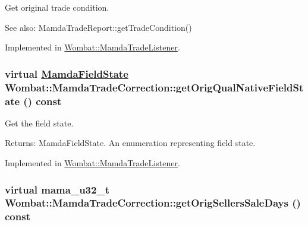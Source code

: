 Get original trade condition. 

\begin{Desc}
\item[See also:]Mamda\-Trade\-Report::get\-Trade\-Condition() \end{Desc}


Implemented in \hyperlink{classWombat_1_1MamdaTradeListener_3d7a8290418015b6f8e1bc2e412225b1}{Wombat::Mamda\-Trade\-Listener}.\hypertarget{classWombat_1_1MamdaTradeCorrection_2ca36bce716c8e36e31fc0b23c108d57}{
\subsubsection[getOrigQualNativeFieldState]{\setlength{\rightskip}{0pt plus 5cm}virtual \hyperlink{namespaceWombat_93aac974f2ab713554fd12a1fa3b7d2a}{Mamda\-Field\-State} Wombat::Mamda\-Trade\-Correction::get\-Orig\-Qual\-Native\-Field\-State () const}}
\label{classWombat_1_1MamdaTradeCorrection_2ca36bce716c8e36e31fc0b23c108d57}


Get the field state. 

\begin{Desc}
\item[Returns:]Mamda\-Field\-State. An enumeration representing field state. \end{Desc}


Implemented in \hyperlink{classWombat_1_1MamdaTradeListener_3901e347c7b178d7c30d016180133738}{Wombat::Mamda\-Trade\-Listener}.\hypertarget{classWombat_1_1MamdaTradeCorrection_22f105f9e575f3bc753d13ec1dbe003a}{
\subsubsection[getOrigSellersSaleDays]{\setlength{\rightskip}{0pt plus 5cm}virtual mama\_\-u32\_\-t Wombat::Mamda\-Trade\-Correction::get\-Orig\-Sellers\-Sale\-Days () const}}
\label{classWombat_1_1MamdaTradeCorrection_22f105f9e575f3bc753d13ec1dbe003a}


